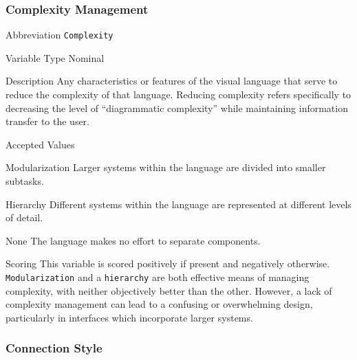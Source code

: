\subsubsection{Complexity Management}
\label{subsubsec:complexity}

\begin{AlignedDesc}
  \item[Abbreviation] \texttt{Complexity}

  \item[Variable Type] Nominal

  \item[Description] Any characteristics or features of the visual language
  that serve to reduce the complexity of that language. Reducing complexity
  refers specifically to decreasing the level of ``diagrammatic
  complexity'' while maintaining information transfer to the
  user.~\cite{moody2009}

  \item[Accepted Values]

  \begin{AlignedDesc}
    \item[Modularization] Larger systems within the language are divided
    into smaller subtasks.~\cite{moody2009}
    \item[Hierarchy] Different systems within the language are represented
    at different levels of detail.~\cite{moody2009}
    \item[None] The language makes no effort to separate components.
  \end{AlignedDesc}

  \item[Scoring] This variable is scored positively if present and
  negatively otherwise.  \texttt{Modularization} and a \texttt{hierarchy}
  are both effective means of managing complexity, with neither objectively
  better than the other. However, a lack of complexity management can lead
  to a confusing or overwhelming design, particularly in interfaces which
  incorporate larger systems.

\end{AlignedDesc}

\subsubsection{Connection Style}
\label{subsubsec:connection}

